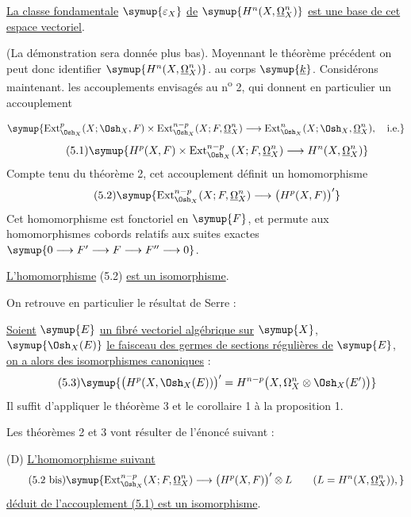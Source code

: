  \uline{La classe fondamentale} $\symup{\varepsilon_X}$ \uline{de}
$\symup{H^{n}(X,\underline{\Omega}_X^{n})}$ \uline{est une base de cet espace vectoriel}.

(La démonstration sera donnée plus bas). Moyennant le théorème précédent on peut
donc identifier $\symup{H^{n}(X,\underline{\Omega}_X^{n})}$. au corps $\symup{\underline{k}}$. Considérons maintenant. les
accouplements envisagés au n\textsuperscript{o} 2, qui donnent en particulier un
accouplement

\[
\symup{\operatorname{Ext}_{\Osh_X}^{p}(X;\Osh_X,F)
\times\operatorname{Ext}_{\Osh_X}^{n-p}(X;F,\underline{\Omega}_X^{n})
\longrightarrow
\operatorname{Ext}_{\Osh_X}^{n}(X;\Osh_X,\underline{\Omega}_X^{n}),\quad\text{i.e.}}
\]
\begin{equation}\tag{5.1}
  \symup{H^{p}(X,F)
  \times\operatorname{Ext}_{\Osh_X}^{n-p}(X;F,\underline{\Omega}_X^{n})
  \longrightarrow H^{n}(X,\underline{\Omega}_X^{n})}
\end{equation}
Compte tenu du théorème 2, cet accouplement définit un homomorphisme
\begin{equation}\tag{5.2}
  \symup{\operatorname{Ext}_{\Osh_X}^{n-p}(X;F,\underline{\Omega}_X^{n})
  \longrightarrow\bigl(H^{p}(X,F)\bigr)'}
\end{equation}
Cet homomorphisme est fonctoriel en $\symup{F}$, et permute aux homomorphismes cobords
relatifs aux suites exactes $\symup{0\longrightarrow F'\longrightarrow F
\longrightarrow F''\longrightarrow0}$.

 \uline{L'homomorphisme} (5.2) \uline{est un isomorphisme}.

On retrouve en particulier le résultat de Serre :

 \uline{Soient} $\symup{E}$ \uline{un fibré vectoriel algébrique sur} $\symup{X}$,
$\symup{\Osh_X(E)}$ \uline{le faisceau des germes de sections régulières de} $\symup{E}$, \uline{on a alors des
isomorphismes canoniques} :
\begin{equation}\tag{5.3}
  \symup{\bigl(H^{p}(X,\Osh_X(E))\bigr)'
  =H^{n-p}\bigl(X,\Omega_X^{n}\otimes\Osh_X(E')\bigr)}
\end{equation}
Il suffit d'appliquer le théorème 3 et le corollaire 1 à la proposition 1.

Les théorèmes 2 et 3 vont résulter de l'énoncé suivant :

\noindent(D) \uline{L'homomorphisme suivant}
\begin{equation}\tag{5.2 bis}
  \symup{\operatorname{Ext}_{\Osh_X}^{n-p}(X;F,\underline{\Omega}_X^{n})
  \longrightarrow\bigl(H^{p}(X,F)\bigr)'\otimes L
  \qquad (L=H^{n}(X,\underline{\Omega}_X^{n})),}
\end{equation}
\uline{déduit de l'accouplement (5.1) est un isomorphisme}.

